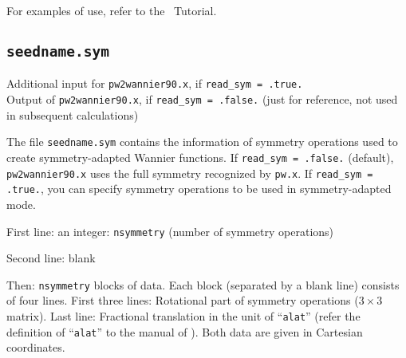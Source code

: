 For examples of use, refer to the \wannier\ Tutorial.


\subsection{{\tt seedname.sym}}

Additional input for {\tt pw2wannier90.x}, if \verb#read_sym = .true.#  \\ 
Output of {\tt pw2wannier90.x}, if \verb#read_sym = .false.# (just for reference, not used in subsequent calculations)

The file \verb#seedname.sym# contains the information of symmetry operations used to create symmetry-adapted Wannier functions.  
If \verb#read_sym = .false.# (default), {\tt pw2wannier90.x} uses the full symmetry recognized by {\tt pw.x}. 
If \verb#read_sym = .true.#, you can specify symmetry operations to be used in symmetry-adapted mode.  


First line: an integer: \verb#nsymmetry# (number of symmetry operations)

Second line: blank
 
Then:   \verb#nsymmetry# blocks of data.  
Each block (separated by a blank line) consists of four lines.  
First three lines: Rotational part of symmetry operations ($3\times3$ matrix). 
Last line: Fractional translation in the unit of ``\verb#alat#'' (refer the definition of ``\verb#alat#'' to the manual of \pwscf). 
Both data are given in Cartesian coordinates. 


